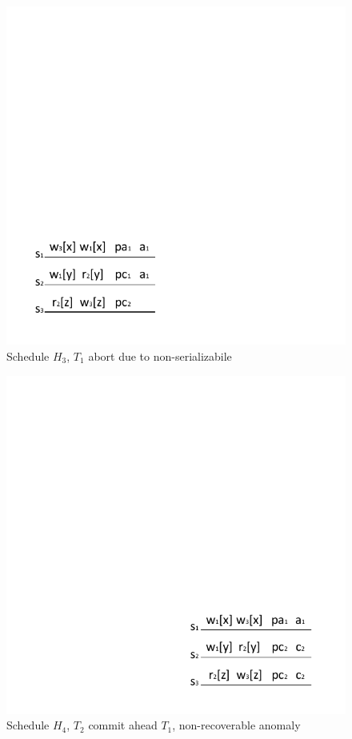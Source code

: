 \documentclass[conference]{IEEEtran}
\begin{document}
\begin{figure}[tbp]
  \centerline{\includegraphics[scale=1]{schedule_not_serializabile.pdf}}
  \caption{Schedule ${H_3}$, ${T_1}$ abort due to non-serializabile}
  \label{fig:schedule_abort_example}
\end{figure}

\begin{figure}[tbp]
  \centerline{\includegraphics[scale=1]{schedule_not_recoverable.pdf}}
  \caption{Schedule ${H_4}$, ${T_2}$ commit ahead ${T_1}$, non-recoverable anomaly}
  \label{fig:schedule_not_recoverable}
\end{figure}
\end{document}
